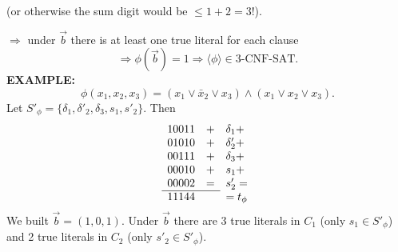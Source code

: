 (or otherwise the sum digit would be $\leq1+2=3$!).

$\Rightarrow$ under $\vec b$ there is at least one true literal for each clause
\[\Rightarrow\phi(\vec b)=1\Rightarrow\langle\phi\rangle\in\mathrm{3\text{-}CNF\text{-}SAT}.\]
\textbf{EXAMPLE:}
\[\phi(x_1,x_2,x_3)=(x_1\lor\bar x_2\lor x_3)\land(x_1\lor x_2\lor x_3).\]
Let $S'_\phi=\{\delta_1,\delta'_2,\delta_3,s_1,s'_2\}$. Then
\[
\begin{array}{rrl}
10011&+&\delta_1+\\
01010&+&\delta'_2+\\
00111&+&\delta_3+\\
00010&+&s_1+\\
00002&=&s'_2=\\\cline{1-2}
11144&&=t_\phi
\end{array}
\]
We built $\vec b=(1,0,1)$. Under $\vec b$ there are 3 true literals in $C_1$ (only $s_1\in S'_\phi$) and 2 true literals in $C_2$ (only $s'_2\in S'_\phi$).
